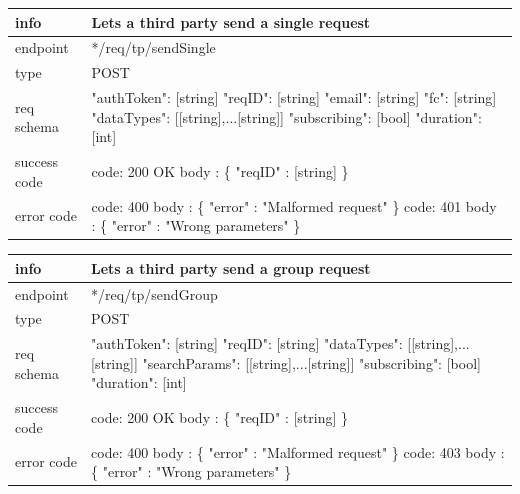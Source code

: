 \documentclass[titlepage]{article}
\begin{document}
\begin{tabularx}{\textwidth}{lX} \hline
    info & Lets a third party send a single request \\ \hline
    endpoint & */req/tp/sendSingle \\ \hline
    type & POST \\ \hline
    req schema & 
    "authToken": [string] \newline
    "reqID": [string] \newline
    "email": [string] \newline
    "fc": [string] \newline
    "dataTypes": [[string],...[string]] \newline
    "subscribing": [bool] \newline
    "duration": [int] \\ \hline
    success code &
        code: 200 OK \newline  
        body : \{ \newline
        "reqID" : [string] \newline
        \} \\ \hline
    error code &
        code: 400 \newline
        body : \{ "error" : "Malformed request" \} \newline \newline
        code: 401 \newline
        body : \{ "error" : "Wrong parameters" \}\\ \hline
\end{tabularx}
		
\vspace{\baselineskip}

\begin{tabularx}{\textwidth}{lX} \hline
    info & Lets a third party send a group request \\ \hline
    endpoint & */req/tp/sendGroup \\ \hline
    type & POST \\ \hline
    req schema &
    "authToken": [string] \newline
    "reqID": [string] \newline
    "dataTypes": [[string],...[string]] \newline
    "searchParams": [[string],...[string]] \newline
    "subscribing": [bool] \newline
    "duration": [int] \\ \hline
    success code &
        code: 200 OK \newline  
        body : \{ \newline
        "reqID" : [string] \newline
        \} \\ \hline
    error code &
        code: 400 \newline
        body : \{ "error" : "Malformed request" \} \newline \newline
        code: 403 \newline
        body : \{ "error" : "Wrong parameters" \}\\ \hline
\end{tabularx}
		
\end{document}
